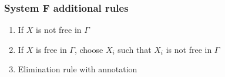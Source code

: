 \documentclass{beamer}
\begin{document}
\begin{frame}
\frametitle{System F additional rules}
\begin{enumerate}

\item If $X$ is not free in $\Gamma$

\begin{prooftree}
\end{prooftree}

\item If $X$ is free in $\Gamma$, choose $X_i$ such that $X_i$ is not free in $\Gamma$

\begin{prooftree}
\end{prooftree}

\item Elimination rule with annotation

\begin{prooftree}
\end{prooftree}

\end{enumerate}

\end{frame}
\end{document}
